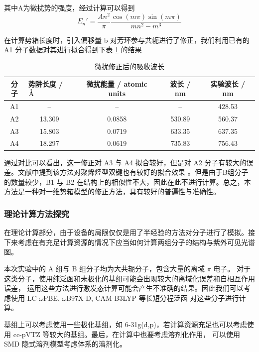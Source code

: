 \documentclass[cn,hazy,pku,12pt,normal,math=newtx,cite=super]{elegantnote}
\begin{document}
其中A为微扰势的强度，经过计算可以得到
\begin{equation}
    E_{n}'= \frac{An^2}{\pi} \frac{\cos(m\pi)\sin(m\pi)}{mn^2-m^3}
\end{equation}

在计算势箱长度时，引入偏移量 b 对芳环参与共轭进行了修正，我们利用已有的 A1 分子数据对其进行拟合得到下表 \ref{20} 的结果

\begin{table}[h]
    \centering
    \caption{微扰修正后的吸收波长}
    \label{20}
    \begin{tabular}{ccccc}
    \hline
    分子 & \multicolumn{1}{l}{势阱长度 / $\rm \mathring{A}$} & 微扰能量 / atomic units & 波长 / nm & 实验波长 / nm \\ \hline
    A1 & --                                   & --                  & --  & 428.53    \\
    A2 & 13.309                               & 0.0858              & 530.89  & 560.37    \\
    A3 & 15.803                               & 0.0719              & 633.35  & 637.35    \\
    A4 & 18.297                               & 0.0619              & 735.83  & 756.43    \\ \hline
    \end{tabular}
\end{table}

通过对比可以看出，这一修正对 A3 与 A4 拟合较好，但是对 A2 分子有较大的误差。文献中提到该方法对聚烯烃型双键也有较好的拟合效果
。但是由于B组分子的数量较少，B1 与 B2 在结构上的相似性不大，因此在此不进行计算。总之，本方法是一种对一维势箱模型的修正方法，具有较好的普遍性与准确性。



\subsubsection{理论计算方法探究}

在理论计算部分，由于设备的局限仅仅是用了半经验的方法对分子进行了模拟。接下来考虑在有充足计算资源的情况下应当如何计算两组分子的结构与紫外可见光谱图。

本次实验中的 A 组与 B 组分子均为大共轭分子，包含大量的离域 $\pi$ 电子。
对于这类分子，使用纯泛函和未极化的基组可能会出现较大的离域化误差和自相互作用误差，
运用这些方法进行激发态计算可能会产生不准确的结果。因此我们可以考虑使用 LC-$\omega$PBE, $\omega$B97X-D, CAM-B3LYP 等长短分程泛函
对这些分子进行计算。

基组上可以考虑使用一些极化基组，如 6-31g(d,p)，若计算资源充足也可以考虑使用 cc-pVTZ 等较大的基组。最后，在计算中也要考虑溶剂化作用，
可以使用 SMD 隐式溶剂模型考虑体系的溶剂化。
\end{document}
